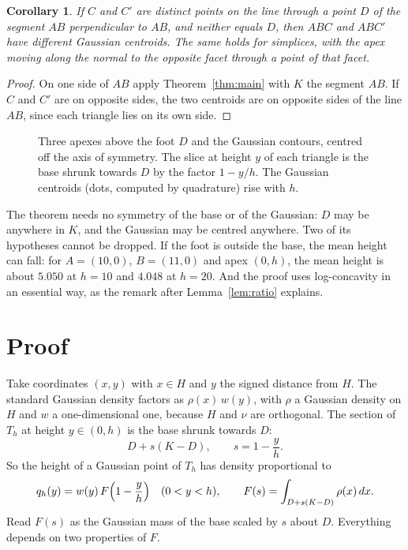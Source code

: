\documentclass[11pt]{article}
\newtheorem{corollary}{Corollary}
\theoremstyle{remark}
\begin{document}
\begin{corollary}\label{cor:tri}
If $C$ and $C'$ are distinct points on the line through a point $D$ of the segment $AB$ perpendicular to $AB$,
and neither equals $D$, then $ABC$ and $ABC'$ have different Gaussian centroids. The same holds for simplices,
with the apex moving along the normal to the opposite facet through a point of that facet.
\end{corollary}

\begin{proof}
On one side of $AB$ apply Theorem~\ref{thm:main} with $K$ the segment $AB$. If $C$ and $C'$ are on opposite
sides, the two centroids are on opposite sides of the line $AB$, since each triangle lies on its own side.
\end{proof}

\begin{figure}[ht]
\centering

\caption{Three apexes above the foot $D$ and the Gaussian contours, centred off the axis of symmetry. The slice
at height $y$ of each triangle is the base shrunk towards $D$ by the factor $1-y/h$. The Gaussian centroids
(dots, computed by quadrature) rise with $h$.}
\label{fig:slices}
\end{figure}

The theorem needs no symmetry of the base or of the Gaussian: $D$ may be anywhere in $K$, and the Gaussian may
be centred anywhere. Two of its hypotheses cannot be dropped. If the foot is outside the base, the mean height
can fall: for $A=(10,0)$, $B=(11,0)$ and apex $(0,h)$, the mean height is about $5.050$ at $h=10$ and $4.048$
at $h=20$. And the proof uses log-concavity in an essential way, as the remark after Lemma~\ref{lem:ratio}
explains.

\section{Proof}

Take coordinates $(x,y)$ with $x\in H$ and $y$ the signed distance from $H$. The standard Gaussian density
factors as $\rho(x)\,w(y)$, with $\rho$ a Gaussian density on $H$ and $w$ a one-dimensional one, because $H$
and $\nu$ are orthogonal. The section of $T_h$ at height $y\in(0,h)$ is the base shrunk towards $D$:
\[
D+s(K-D),\qquad s=1-\frac yh .
\]
So the height of a Gaussian point of $T_h$ has density proportional to
\[
q_h(y)=w(y)\,F\Bigl(1-\frac yh\Bigr)\quad(0<y<h),\qquad F(s)=\int_{D+s(K-D)}\rho(x)\,dx .
\]
Read $F(s)$ as the Gaussian mass of the base scaled by $s$ about $D$. Everything depends on two properties of
$F$.
\end{document}
